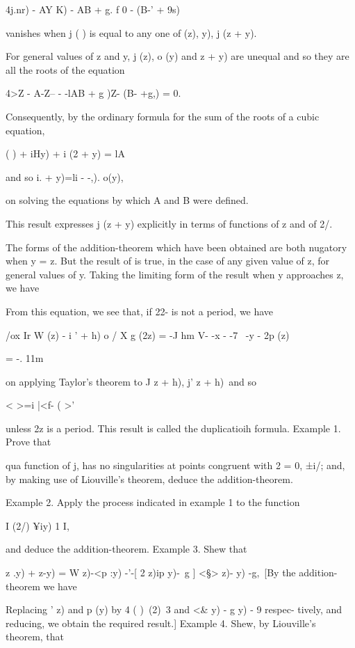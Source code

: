 {4j.nr) - AY K) - AB + g. f 0 - (B-' + 9s)

vanishes when j ( ) is equal to any one of (z), y), j (z + y).

For general values of z and y, j (z), o (y) and z + y) are unequal and
so they are all the roots of the equation

4>Z - A-Z-- - -lAB + g )Z- (B- +g,) = 0.

Consequently, by the ordinary formula for the sum of the roots of a
cubic equation,

 ( ) + iHy) + i (2 + y) = lA%

and so i. + y)=li - -,). o(y),

on solving the equations by which A and B were defined.

This result expresses j (z + y) explicitly in terms of functions of z
and of 2/.


The forms of the addition-theorem which have been obtained are both
nugatory when y = z. But the result of is true, in the case of
any given value of z, for general values of y. Taking the limiting
form of the result when y approaches z, we have

From this equation, we see that, if 22- is not a period, we have

/ox Ir W (z) - i ' + h) o / X g (2z) = -J hm V- -x - -7 ~-y - 2p (z)

= -. 11m

on applying Taylor's theorem to J z + h), j' z + h)\ and so

 < >=i |<f- ( >'

unless 2z is a period. This result is called the duplicatioih formula.
Example 1. Prove that

qua function of j, has no singularities at points congruent with 2 =
0, ±i/; and, by making use of Liouville's theorem, deduce the
addition-theorem.

%
%

Example 2. Apply the process indicated in example 1 to the function

I (2/) ¥iy) 1 I,

and deduce the addition-theorem. Example 3. Shew that

  z .y) + z-y) = W z)-<p :y) -'-[ 2 z)ip y)-\ g ] <§> z)- y) -g,\ [By
the addition-theorem we have

Replacing ' z) and p (y) by 4 ( )\ (2)\ 3 and <\& y) - g y) - 9
respec- tively, and reducing, we obtain the required result.] Example
4. Shew, by Liouville's theorem, that

}

